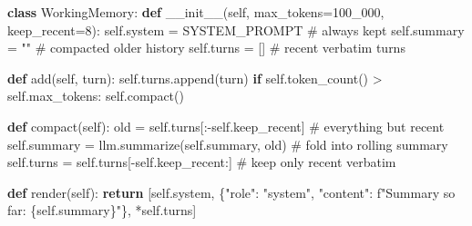 \documentclass[11pt]{article}
\newenvironment{Shaded}{\begin{snugshade}}{\end{snugshade}}
\newcommand{\CommentTok}[1]{\textcolor[rgb]{0.48,0.49,0.49}{#1}}
\newcommand{\ControlFlowTok}[1]{\textcolor[rgb]{0.99,0.74,0.29}{\textbf{#1}}}
\newcommand{\DecValTok}[1]{\textcolor[rgb]{0.96,0.45,0.00}{#1}}
\newcommand{\FunctionTok}[1]{\textcolor[rgb]{0.56,0.27,0.68}{#1}}
\newcommand{\KeywordTok}[1]{\textcolor[rgb]{0.81,0.81,0.76}{\textbf{#1}}}
\newcommand{\NormalTok}[1]{\textcolor[rgb]{0.81,0.81,0.76}{#1}}
\newcommand{\OperatorTok}[1]{\textcolor[rgb]{0.81,0.81,0.76}{#1}}
\newcommand{\SpecialCharTok}[1]{\textcolor[rgb]{0.24,0.68,0.91}{#1}}
\newcommand{\SpecialStringTok}[1]{\textcolor[rgb]{0.85,0.27,0.33}{#1}}
\newcommand{\StringTok}[1]{\textcolor[rgb]{0.96,0.31,0.31}{#1}}
\newcommand{\VariableTok}[1]{\textcolor[rgb]{0.15,0.68,0.68}{#1}}
\begin{document}

\begin{Shaded}
\begin{Highlighting}[]
\KeywordTok{class}\NormalTok{ WorkingMemory:}
    \KeywordTok{def} \FunctionTok{\_\_init\_\_}\NormalTok{(}\VariableTok{self}\NormalTok{, max\_tokens}\OperatorTok{=}\DecValTok{100\_000}\NormalTok{, keep\_recent}\OperatorTok{=}\DecValTok{8}\NormalTok{):}
        \VariableTok{self}\NormalTok{.system }\OperatorTok{=}\NormalTok{ SYSTEM\_PROMPT          }\CommentTok{\# always kept}
        \VariableTok{self}\NormalTok{.summary }\OperatorTok{=} \StringTok{""}                    \CommentTok{\# compacted older history}
        \VariableTok{self}\NormalTok{.turns }\OperatorTok{=}\NormalTok{ []                      }\CommentTok{\# recent verbatim turns}

    \KeywordTok{def}\NormalTok{ add(}\VariableTok{self}\NormalTok{, turn):}
        \VariableTok{self}\NormalTok{.turns.append(turn)}
        \ControlFlowTok{if} \VariableTok{self}\NormalTok{.token\_count() }\OperatorTok{\textgreater{}} \VariableTok{self}\NormalTok{.max\_tokens:}
            \VariableTok{self}\NormalTok{.compact()}

    \KeywordTok{def}\NormalTok{ compact(}\VariableTok{self}\NormalTok{):}
\NormalTok{        old }\OperatorTok{=} \VariableTok{self}\NormalTok{.turns[:}\OperatorTok{{-}}\VariableTok{self}\NormalTok{.keep\_recent]                }\CommentTok{\# everything but recent}
        \VariableTok{self}\NormalTok{.summary }\OperatorTok{=}\NormalTok{ llm.summarize(}\VariableTok{self}\NormalTok{.summary, old)     }\CommentTok{\# fold into rolling summary}
        \VariableTok{self}\NormalTok{.turns }\OperatorTok{=} \VariableTok{self}\NormalTok{.turns[}\OperatorTok{{-}}\VariableTok{self}\NormalTok{.keep\_recent:]         }\CommentTok{\# keep only recent verbatim}

    \KeywordTok{def}\NormalTok{ render(}\VariableTok{self}\NormalTok{):}
        \ControlFlowTok{return}\NormalTok{ [}\VariableTok{self}\NormalTok{.system,}
\NormalTok{                \{}\StringTok{"role"}\NormalTok{: }\StringTok{"system"}\NormalTok{, }\StringTok{"content"}\NormalTok{: }\SpecialStringTok{f"Summary so far: }\SpecialCharTok{\{}\VariableTok{self}\SpecialCharTok{.}\NormalTok{summary}\SpecialCharTok{\}}\SpecialStringTok{"}\NormalTok{\},}
                \OperatorTok{*}\VariableTok{self}\NormalTok{.turns]}
\end{Highlighting}
\end{Shaded}
\end{document}
